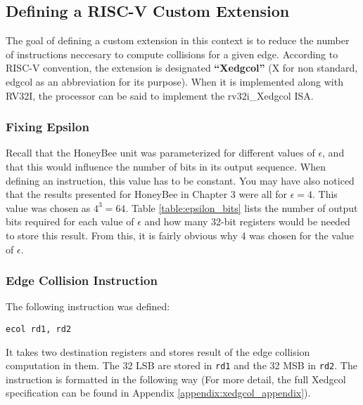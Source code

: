 \subsection{Defining a RISC-V Custom Extension}

    The goal of defining a custom extension in this context is to reduce the number of instructions neccesary to compute collisions for a given edge. According to RISC-V convention, the extension is designated \textbf{``Xedgcol''} (X for non standard, edgcol as an abbreviation for its purpose). When it is implemented along with RV32I, the processor can be said to implement the rv32i\_Xedgcol ISA.

    \subsubsection{Fixing Epsilon}
    Recall that the HoneyBee unit was parameterized for different values of $\epsilon$, and that this would influence the number of bits in its output sequence. When defining an instruction, this value has to be constant. You may have also noticed that the results presented for HoneyBee in Chapter 3 were all for $\epsilon = 4$. This value was chosen as $4^3 = 64$. Table \ref{table:epsilon_bits} lists the number of output bits required for each value of $\epsilon$ and how many 32-bit registers would be needed to store this result. From this, it is fairly obvious why 4 was chosen for the value of $\epsilon$.

    


    \subsubsection{Edge Collision Instruction}
    The following instruction was defined:

    \begin{center}
    \texttt{ecol rd1, rd2}
    \end{center}

    It takes two destination registers and stores result of the edge collision computation in them. The 32 \gls{LSB} are stored in \texttt{rd1} and the 32 \gls{MSB} in \texttt{rd2}.
    The instruction is formatted in the following way (For more detail, the full Xedgcol specification can be found in Appendix \ref{appendix:xedgcol_appendix}).

